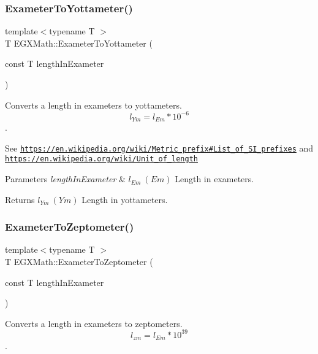 \subsubsection{\texorpdfstring{Exameter\+To\+Yottameter()}{ExameterToYottameter()}}
{\footnotesize\ttfamily template$<$typename T $>$ \\
T E\+G\+X\+Math\+::\+Exameter\+To\+Yottameter (\begin{DoxyParamCaption}\item[{const T}]{length\+In\+Exameter }\end{DoxyParamCaption})}



Converts a length in exameters to yottameters. \[ l_{Ym}=l_{Em} * 10^{-6} \]. 

See \href{https://en.wikipedia.org/wiki/Metric_prefix#List_of_SI_prefixes}{\tt https\+://en.\+wikipedia.\+org/wiki/\+Metric\+\_\+prefix\#\+List\+\_\+of\+\_\+\+S\+I\+\_\+prefixes} and \href{https://en.wikipedia.org/wiki/Unit_of_length}{\tt https\+://en.\+wikipedia.\+org/wiki/\+Unit\+\_\+of\+\_\+length} 
\begin{DoxyParams}{Parameters}
{\em length\+In\+Exameter} & $ l_{Em}\ (Em)$ Length in exameters. \\
\hline
\end{DoxyParams}
\begin{DoxyReturn}{Returns}
$ l_{Ym}\ (Ym)$ Length in yottameters. 
\end{DoxyReturn}
\mbox{\label{group___e_g_x_math-_conversions-_length_conversions-_s_i-_exameter-_s_i_ga5c4c4016d9d88622b4f3c5c071779025}} 
\subsubsection{\texorpdfstring{Exameter\+To\+Zeptometer()}{ExameterToZeptometer()}}
{\footnotesize\ttfamily template$<$typename T $>$ \\
T E\+G\+X\+Math\+::\+Exameter\+To\+Zeptometer (\begin{DoxyParamCaption}\item[{const T}]{length\+In\+Exameter }\end{DoxyParamCaption})}



Converts a length in exameters to zeptometers. \[ l_{zm}=l_{Em} * 10^{39} \]. 

